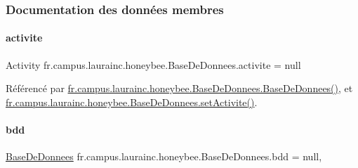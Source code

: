 \subsubsection{Documentation des données membres}
\mbox{\label{classfr_1_1campus_1_1laurainc_1_1honeybee_1_1_base_de_donnees_aad4fd29f29916bc4277fa16262d19431}} 
\paragraph{\texorpdfstring{activite}{activite}}
{\footnotesize\ttfamily Activity fr.\+campus.\+laurainc.\+honeybee.\+Base\+De\+Donnees.\+activite = null\hspace{0.3cm}{\ttfamily [private]}}



Référencé par \hyperlink{classfr_1_1campus_1_1laurainc_1_1honeybee_1_1_base_de_donnees_a3023d75b636efcfbb2c6b6ac5c702c42}{fr.\+campus.\+laurainc.\+honeybee.\+Base\+De\+Donnees.\+Base\+De\+Donnees()}, et \hyperlink{classfr_1_1campus_1_1laurainc_1_1honeybee_1_1_base_de_donnees_a4d5b875376c84e702c60bb54cee58c3f}{fr.\+campus.\+laurainc.\+honeybee.\+Base\+De\+Donnees.\+set\+Activite()}.

\mbox{\label{classfr_1_1campus_1_1laurainc_1_1honeybee_1_1_base_de_donnees_a6afcd3f4c69f15afa0c675a848bf97a7}} 
\paragraph{\texorpdfstring{bdd}{bdd}}
{\footnotesize\ttfamily \hyperlink{classfr_1_1campus_1_1laurainc_1_1honeybee_1_1_base_de_donnees}{Base\+De\+Donnees} fr.\+campus.\+laurainc.\+honeybee.\+Base\+De\+Donnees.\+bdd = null\hspace{0.3cm}{\ttfamily [static]}, {\ttfamily [private]}}



